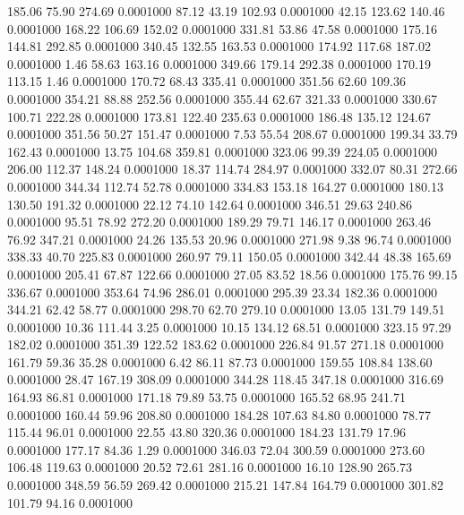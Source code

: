  185.06   75.90  274.69   0.0001000
  87.12   43.19  102.93   0.0001000
  42.15  123.62  140.46   0.0001000
 168.22  106.69  152.02   0.0001000
 331.81   53.86   47.58   0.0001000
 175.16  144.81  292.85   0.0001000
 340.45  132.55  163.53   0.0001000
 174.92  117.68  187.02   0.0001000
   1.46   58.63  163.16   0.0001000
 349.66  179.14  292.38   0.0001000
 170.19  113.15    1.46   0.0001000
 170.72   68.43  335.41   0.0001000
 351.56   62.60  109.36   0.0001000
 354.21   88.88  252.56   0.0001000
 355.44   62.67  321.33   0.0001000
 330.67  100.71  222.28   0.0001000
 173.81  122.40  235.63   0.0001000
 186.48  135.12  124.67   0.0001000
 351.56   50.27  151.47   0.0001000
   7.53   55.54  208.67   0.0001000
 199.34   33.79  162.43   0.0001000
  13.75  104.68  359.81   0.0001000
 323.06   99.39  224.05   0.0001000
 206.00  112.37  148.24   0.0001000
  18.37  114.74  284.97   0.0001000
 332.07   80.31  272.66   0.0001000
 344.34  112.74   52.78   0.0001000
 334.83  153.18  164.27   0.0001000
 180.13  130.50  191.32   0.0001000
  22.12   74.10  142.64   0.0001000
 346.51   29.63  240.86   0.0001000
  95.51   78.92  272.20   0.0001000
 189.29   79.71  146.17   0.0001000
 263.46   76.92  347.21   0.0001000
  24.26  135.53   20.96   0.0001000
 271.98    9.38   96.74   0.0001000
 338.33   40.70  225.83   0.0001000
 260.97   79.11  150.05   0.0001000
 342.44   48.38  165.69   0.0001000
 205.41   67.87  122.66   0.0001000
  27.05   83.52   18.56   0.0001000
 175.76   99.15  336.67   0.0001000
 353.64   74.96  286.01   0.0001000
 295.39   23.34  182.36   0.0001000
 344.21   62.42   58.77   0.0001000
 298.70   62.70  279.10   0.0001000
  13.05  131.79  149.51   0.0001000
  10.36  111.44    3.25   0.0001000
  10.15  134.12   68.51   0.0001000
 323.15   97.29  182.02   0.0001000
 351.39  122.52  183.62   0.0001000
 226.84   91.57  271.18   0.0001000
 161.79   59.36   35.28   0.0001000
   6.42   86.11   87.73   0.0001000
 159.55  108.84  138.60   0.0001000
  28.47  167.19  308.09   0.0001000
 344.28  118.45  347.18   0.0001000
 316.69  164.93   86.81   0.0001000
 171.18   79.89   53.75   0.0001000
 165.52   68.95  241.71   0.0001000
 160.44   59.96  208.80   0.0001000
 184.28  107.63   84.80   0.0001000
  78.77  115.44   96.01   0.0001000
  22.55   43.80  320.36   0.0001000
 184.23  131.79   17.96   0.0001000
 177.17   84.36    1.29   0.0001000
 346.03   72.04  300.59   0.0001000
 273.60  106.48  119.63   0.0001000
  20.52   72.61  281.16   0.0001000
  16.10  128.90  265.73   0.0001000
 348.59   56.59  269.42   0.0001000
 215.21  147.84  164.79   0.0001000
 301.82  101.79   94.16   0.0001000
